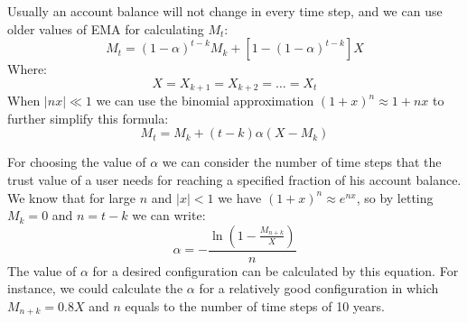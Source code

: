 \documentclass{article}
\begin{document}
    Usually an account balance will not change in every time step, and we can use older values of EMA for calculating
    $M_{t}$:
    \[
        M_{t} = (1 - \alpha)^{t - k}M_{k} + [1 - (1 - \alpha)^{t - k}]X
    \]
    Where:
    \[
        X = X_{k+1} = X_{k+2} = \dots = X_t
    \]
    When $|nx| \ll 1$ we can use the binomial approximation  $(1 + x)^n \approx 1 + nx$ to further simplify this
    formula:
    \[
        M_{t} = M_{k} + (t - k) \alpha (X - M_{k})
    \]

    For choosing the value of $\alpha$ we can consider the number of time steps that the trust value of a user needs
    for reaching a specified fraction of his account balance.
    We know that for large $n$ and $|x| < 1$ we have $(1 + x)^{n} \approx e^{nx}$, so by letting $M_{k} = 0$ and
    $n = t - k$
    we can write:
    \[
        \alpha =- \frac{\ln\left(1 - \frac{M_{n + k}}{X}\right)}{n}
    \]
    The value of $\alpha$ for a desired configuration can be calculated by this equation.
    For instance, we could calculate the $\alpha$ for a relatively good configuration in which $M_{n+k} = 0.8X$ and $n$
    equals to the number of time steps of 10 years.
\end{document}
